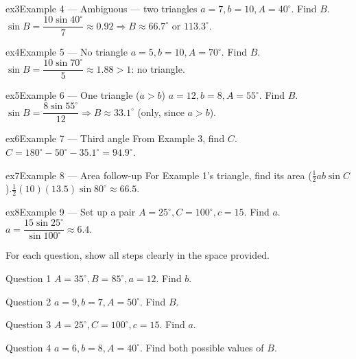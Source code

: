 \documentclass[11pt]{article}
\begin{document}
\begin{example}{ex3}{Example 4 --- Ambiguous — two triangles}
$a=7,b=10,A=40^\circ$. Find $B$.\soln $\sin B=\dfrac{10\sin40^\circ}{7}\approx0.92\Rightarrow B\approx66.7^\circ$ or $113.3^\circ$.
\end{example}

\begin{example}{ex4}{Example 5 --- No triangle}
$a=5,b=10,A=70^\circ$. Find $B$.\soln $\sin B=\dfrac{10\sin70^\circ}{5}\approx1.88>1$: no triangle.
\end{example}

\begin{example}{ex5}{Example 6 --- One triangle ($a>b$)}
$a=12,b=8,A=55^\circ$. Find $B$.\soln $\sin B=\dfrac{8\sin55^\circ}{12}\Rightarrow B\approx33.1^\circ$ (only, since $a>b$).
\end{example}

\begin{example}{ex6}{Example 7 --- Third angle}
From Example 3, find $C$.\soln $C=180^\circ-50^\circ-35.1^\circ=94.9^\circ$.
\end{example}

\begin{example}{ex7}{Example 8 --- Area follow-up}
For Example 1's triangle, find its area ($\tfrac12ab\sin C$).\soln $\tfrac12(10)(13.5)\sin80^\circ\approx66.5$.
\end{example}

\begin{example}{ex8}{Example 9 --- Set up a pair}
$A=25^\circ,C=100^\circ,c=15$. Find $a$.\soln $a=\dfrac{15\sin25^\circ}{\sin100^\circ}\approx6.4$.
\end{example}

\clearpage
{}
For each question, show all steps clearly in the space provided.

\begin{qbox}{Question 1}
$A=35^\circ,B=85^\circ,a=12$. Find $b$.\workspace{2.4cm}
\end{qbox}

\begin{qbox}{Question 2}
$a=9,b=7,A=50^\circ$. Find $B$.\workspace{2.4cm}
\end{qbox}

\begin{qbox}{Question 3}
$A=25^\circ,C=100^\circ,c=15$. Find $a$.\workspace{2.4cm}
\end{qbox}

\begin{qbox}{Question 4}
$a=6,b=8,A=40^\circ$. Find both possible values of $B$.\workspace{2.4cm}
\end{qbox}
\end{document}
